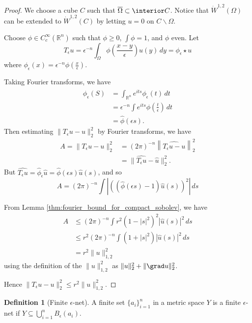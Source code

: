 \documentclass[10pt, oneside, reqno]{amsart}
\theoremstyle{plain}%
\numberwithin{equation}{section}
\theoremstyle{definition}
\newtheorem{defn}[thm]{Definition}
\theoremstyle{remark}
\newcommand{\R}{\mathbb{R}}
\begin{document}
\begin{proof} 
    We choose a cube $C$ such that $\overline \Omega \subset \interior C$.  Notice that $\dot W^{1, 2}(\Omega)$ can be extended to $\dot W^{1, 2}(C)$ by letting $u = 0$ on $C \backslash \Omega$.  
    
    Choose $\phi \in C^\infty_c(\R^n)$ such that $\phi \geq 0$, $\int \phi = 1$, and $\phi$ even.  Let \[
        T_\epsilon u = \epsilon^{-n} \int_\Omega \phi\left(\frac{x-y}{\epsilon} \right) u(y) \, dy = \phi_\epsilon \star u
    \] where $\phi_\epsilon(x) = \epsilon^{-n} \phi \left( \frac{x}{\epsilon} \right)$.
    
    Taking Fourier transforms, we have
    \begin{align*}
        \hat \phi_\epsilon(S) &= \int_{\R^n} e^{its} \phi_\epsilon(t) \, dt \\
            &= \epsilon^{-n} \int e^{its} \phi \left( \frac{t}{\epsilon} \right) \, dt \\
            &= \hat \phi(\epsilon s).
    \end{align*}  Then estimating $\| T_\epsilon u - u \|_2^2$ by Fourier transforms, we have \begin{align*}
        A = \| T_\epsilon u - u \|_2^2 &= (2 \pi)^{-n} \left\| \hat{T_\epsilon u - u}\right\|_2^2 \\
        &= \| \hat{T_\epsilon u } - \hat u \|_2^2.  
    \end{align*}  But $\hat{T_\epsilon u} = \hat \phi_\epsilon \hat u = \hat \phi (\epsilon s) \hat u(s)$, and so \[
        A = (2 \pi)^{-n} \int \left| \left( \left( \hat \phi(\epsilon s) - 1 \right) \hat u(s) \right)^2 \right| \, ds
    \]
    
    
    
     From Lemma \ref{thm:fourier_bound_for_compact_sobolev}, we have \begin{align*}
        A &\leq (2 \pi)^{-n} \int r^2 \left(1 - |s|^2 \right)^2 \left| \hat u (s) \right|^2 \, ds \\
        &\leq r^2 (2 \pi)^{-n} \int \left( 1 + |s|^2 \right) \left| \hat u(s)\right|^2 \, ds \\
        &= r^2 \| u \|_{1, 2}^2
    \end{align*} using the definition of the $\|u \|_{1, 2}^2$  as $\| u \|_2^2 + \| \grad u \|_2^2$.  
    
    Hence $\|T_\epsilon u - u \|_2^2 \leq r^2 \| u \|_{1, 2}^2$.
\end{proof}

\begin{defn}[Finite $\epsilon$-net]
A finite set $\{ a_i \}_{i=1}^n$ in a metric space $Y$ is a finite $\epsilon$-net if $Y \subseteq \bigcup_{i=1}^n B_\epsilon(a_i)$.
\end{defn}
\end{document}
